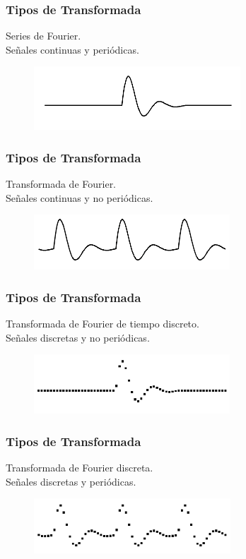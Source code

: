 \documentclass[12pt]{beamer}
\begin{document}
\begin{frame}
\frametitle{Tipos de Transformada}
Series de Fourier.
\\
\bigskip
Señales continuas y periódicas.
\begin{figure}
    \centering
    \includegraphics[scale=0.8]{Imagenes/TDF_01.png}
\end{figure}
\end{frame}
\begin{frame}
\frametitle{Tipos de Transformada}
Transformada de Fourier.
\\
\bigskip
Señales continuas y no periódicas.
\begin{figure}
    \centering
    \includegraphics[scale=0.8]{Imagenes/TDF_02.png}
\end{figure}
\end{frame}
\begin{frame}
\frametitle{Tipos de Transformada}
Transformada de Fourier de tiempo discreto.
\\
\bigskip
Señales discretas y no periódicas.
\begin{figure}
    \centering
    \includegraphics[scale=0.8]{Imagenes/TDF_03.png}
\end{figure}
\end{frame}
\begin{frame}
\frametitle{Tipos de Transformada}
Transformada de Fourier discreta.
\\
\bigskip
Señales discretas y periódicas.
\begin{figure}
    \centering
    \includegraphics[scale=0.8]{Imagenes/TDF_04.png}
\end{figure}
\end{frame}
\end{document}
